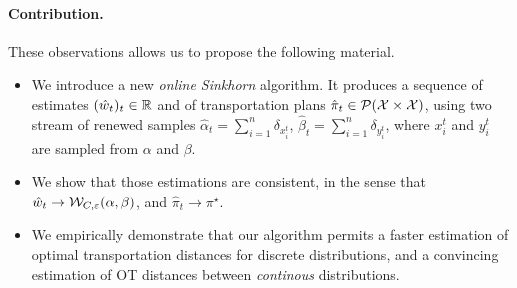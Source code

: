 \paragraph{Contribution.}These observations allows us to propose the following
material.
\begin{itemize}
    \item We introduce a new \textit{online Sinkhorn} algorithm. It produces a sequence of
    estimates $(\hat w_t)_t \in \mathbb{R}$ and of transportation plans $\hat \pi_t \in
    \mathcal{P}(\mathcal{X} \times \mathcal{X})$, using two stream of renewed samples $\hat \alpha_t =
    \sum_{i=1}^n \delta_{x^t_i}$, $\hat \beta_t = \sum_{i=1}^n \delta_{y^t_i}$,
    where $x^t_i$ and $y^t_i$ are sampled from $\alpha$ and $\beta$.
    \item We show that those estimations are consistent, in the sense that $\hat
    w_t \to \mathcal{W}_{C,\varepsilon}(\alpha, \beta)$, and $\hat \pi_t \to \pi^\star$.
    \item We empirically demonstrate that our algorithm permits a faster
    estimation of optimal transportation distances for discrete distributions,
    and a convincing estimation of OT distances between \textit{continous} distributions.
\end{itemize}

